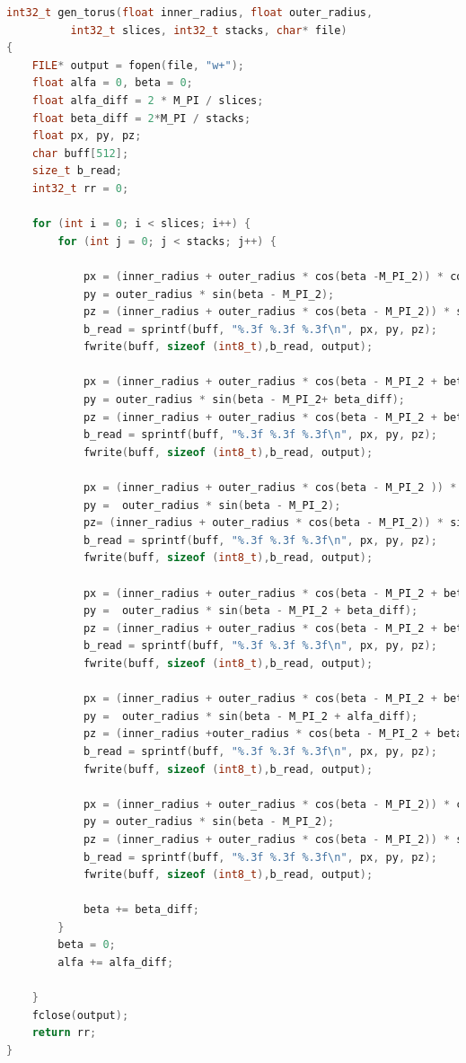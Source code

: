 \documentclass[14pt, a4 paper]{article}
\begin{document}
\begin{lstlisting}[language = c++]
int32_t gen_torus(float inner_radius, float outer_radius,
		  int32_t slices, int32_t stacks, char* file)
{
	FILE* output = fopen(file, "w+");
	float alfa = 0, beta = 0;
	float alfa_diff = 2 * M_PI / slices;
	float beta_diff = 2*M_PI / stacks;
	float px, py, pz;
	char buff[512];
	size_t b_read;
	int32_t rr = 0;

	for (int i = 0; i < slices; i++) {
		for (int j = 0; j < stacks; j++) {

			px = (inner_radius + outer_radius * cos(beta -M_PI_2)) * cos(alfa);
			py = outer_radius * sin(beta - M_PI_2);
			pz = (inner_radius + outer_radius * cos(beta - M_PI_2)) * sin(alfa);
			b_read = sprintf(buff, "%.3f %.3f %.3f\n", px, py, pz);
			fwrite(buff, sizeof (int8_t),b_read, output);

			px = (inner_radius + outer_radius * cos(beta - M_PI_2 + beta_diff)) * cos(alfa);
			py = outer_radius * sin(beta - M_PI_2+ beta_diff);
			pz = (inner_radius + outer_radius * cos(beta - M_PI_2 + beta_diff)) * sin(alfa);
			b_read = sprintf(buff, "%.3f %.3f %.3f\n", px, py, pz);
			fwrite(buff, sizeof (int8_t),b_read, output);

			px = (inner_radius + outer_radius * cos(beta - M_PI_2 )) * cos(alfa+alfa_diff);
			py =  outer_radius * sin(beta - M_PI_2);
			pz= (inner_radius + outer_radius * cos(beta - M_PI_2)) * sin(alfa+alfa_diff);
			b_read = sprintf(buff, "%.3f %.3f %.3f\n", px, py, pz);
			fwrite(buff, sizeof (int8_t),b_read, output);

			px = (inner_radius + outer_radius * cos(beta - M_PI_2 + beta_diff)) * cos(alfa);
			py =  outer_radius * sin(beta - M_PI_2 + beta_diff);
			pz = (inner_radius + outer_radius * cos(beta - M_PI_2 + beta_diff)) * sin(alfa);
			b_read = sprintf(buff, "%.3f %.3f %.3f\n", px, py, pz);
			fwrite(buff, sizeof (int8_t),b_read, output);

			px = (inner_radius + outer_radius * cos(beta - M_PI_2 + beta_diff)) * cos(alfa + alfa_diff);
			py =  outer_radius * sin(beta - M_PI_2 + alfa_diff);
			pz = (inner_radius +outer_radius * cos(beta - M_PI_2 + beta_diff)) * sin(alfa + alfa_diff);
			b_read = sprintf(buff, "%.3f %.3f %.3f\n", px, py, pz);
			fwrite(buff, sizeof (int8_t),b_read, output);

			px = (inner_radius + outer_radius * cos(beta - M_PI_2)) * cos(alfa + alfa_diff);
			py = outer_radius * sin(beta - M_PI_2);
			pz = (inner_radius + outer_radius * cos(beta - M_PI_2)) * sin(alfa + alfa_diff);
			b_read = sprintf(buff, "%.3f %.3f %.3f\n", px, py, pz);
			fwrite(buff, sizeof (int8_t),b_read, output);

			beta += beta_diff;
		}
		beta = 0;
		alfa += alfa_diff;
	
	}
	fclose(output);
	return rr;
}
\end{lstlisting}
\end{document}
